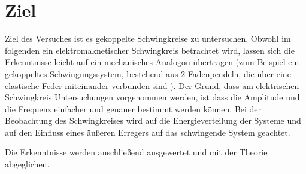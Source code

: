 \section{Ziel}
\label{sec:Ziel}
Ziel des Versuches ist es gekoppelte Schwingkreise zu untersuchen. Obwohl im folgenden ein elektromaknetischer
Schwingkreis betrachtet wird, lassen sich die Erkenntnisse leicht auf ein mechanisches Analogon übertragen
(zum Beispiel ein gekoppeltes Schwingungssystem, bestehend aus 2 Fadenpendeln, die über eine elastische Feder miteinander verbunden sind 
\cite{Versuchsanleitung}). Der Grund, dass am elektrischen Schwingkreis Untersuchungen vorgenommen werden, ist dass die Amplitude und die Frequenz
einfacher und genauer bestimmt werden können.
Bei der Beobachtung des Schwingkreises wird auf die Energieverteilung der Systeme und auf den Einfluss
eines äußeren Erregers auf das schwingende System geachtet.

Die Erkenntnisse werden anschließend ausgewertet und mit der Theorie abgeglichen.